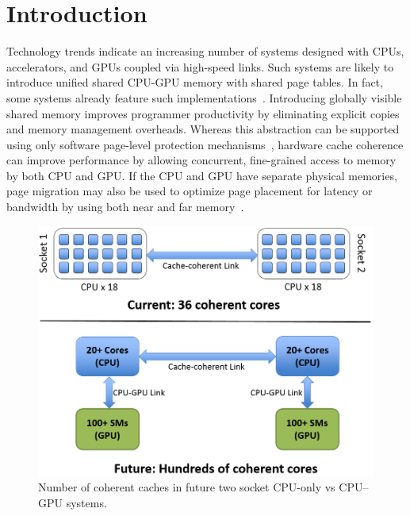 \vspace{-.05in}
\section{Introduction}
\label{introduction}

Technology trends indicate an increasing number of systems designed with CPUs, 
accelerators, and GPUs coupled via high-speed 
links. Such systems are likely to introduce unified shared
CPU-GPU memory with shared page tables. In fact, some systems already
feature such implementations~\cite{AMDKaveri}.
Introducing globally visible shared memory
improves programmer productivity by eliminating explicit copies and memory 
management overheads. Whereas this abstraction can be supported using only
software page-level protection mechanisms~\cite{UVM, HSA}, hardware cache coherence 
can improve performance by allowing concurrent, fine-grained access to memory
by both CPU and GPU.  If the CPU and GPU have separate physical
memories, page migration may also be used to optimize page placement for
latency or bandwidth by using both near and far 
memory~\cite{Dashti2013,Agarwal2015b,Meswani2015,Chou2015}.

\begin{figure}[t]
\centering
\includegraphics[width=1.0\columnwidth]{hpca2016/figures/coherent_cores.png}
\caption{Number of coherent caches in future two socket CPU-only vs CPU--GPU 
systems.}
\vspace{-0.175in}
\label{fig:motivation}
\end{figure}

